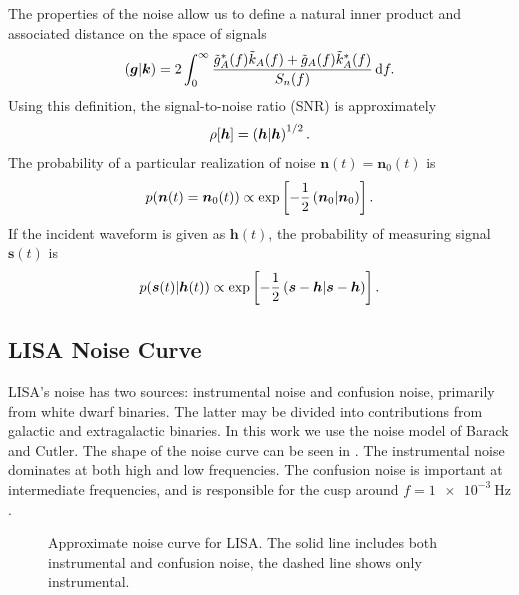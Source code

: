 The properties of the noise allow us to define a natural inner product and associated distance on the space of signals\cite{Cutler1994}
\begin{equation}
\left({\boldsymbol{g}}\middle|{\boldsymbol{k}}\right) = 2\int_{0}^{\infty}{\frac{\tilde{g}_A^*(f)\tilde{k}_A(f) + \tilde{g}_A(f)\tilde{k}_A^*(f)}{S_n(f)}}\,\mathrm{d}{f}.
\label{eq:inner}
\end{equation}
Using this definition, the signal-to-noise ratio (SNR) is approximately
\begin{equation}
\rho[\boldsymbol{h}] = \left({\boldsymbol{h}}\middle|{\boldsymbol{h}}\right)^{1/2}.
\end{equation}
The probability of a particular realization of noise $\boldsymbol{n}(t) = \boldsymbol{n}_0(t)$ is
\begin{equation}
p(\boldsymbol{n}(t) = \boldsymbol{n}_0(t)) \propto \exp\left[-\frac{1}{2}\left({\boldsymbol{n}_0}\middle|{\boldsymbol{n}_0}\right)\right].
\end{equation}
If the incident waveform is given as $\boldsymbol{h}(t)$, the probability of measuring signal $\boldsymbol{s}(t)$ is
\begin{equation}
p(\boldsymbol{s}(t)|\boldsymbol{h}(t)) \propto \exp\left[-\frac{1}{2}\left({\boldsymbol{s}-\boldsymbol{h}}\middle|{\boldsymbol{s}-\boldsymbol{h}}\right)\right].
\label{eq:sig_prob}
\end{equation}

\subsection{LISA Noise Curve}\label{sec:Noise}

LISA's noise has two sources: instrumental noise and confusion noise, primarily from white dwarf binaries. The latter may be divided into contributions from galactic and extragalactic binaries. In this work we use the noise model of Barack and Cutler\cite{Barack2004}. The shape of the noise curve can be seen in . The instrumental noise dominates at both high and low frequencies. The confusion noise is important at intermediate frequencies, and is responsible for the cusp around $f = \SI{1e-3}{\Hz}$.
\begin{figure}
\begin{center}
{}
\caption{Approximate noise curve for LISA\cite{Barack2004}. The solid line includes both instrumental and confusion noise, the dashed line shows only instrumental.}
\label{fig:Noise}
\end{center}
\end{figure}

